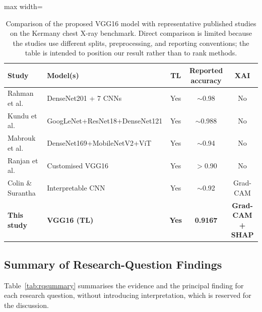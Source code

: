 \documentclass[preprint,12pt]{elsarticle}
\begin{document}
\begin{table}[!ht]
\centering
\caption{Comparison of the proposed VGG16 model with representative published studies on the Kermany chest X-ray benchmark. Direct comparison is limited because the studies use different splits, preprocessing, and reporting conventions; the table is intended to position our result rather than to rank methods.}
\label{tab:published}
\begin{adjustbox}{max width=\textwidth}
\begin{tabular}{l l c c c}
\toprule
\textbf{Study} & \textbf{Model(s)} & \textbf{TL} & \textbf{Reported accuracy} & \textbf{XAI} \\
\midrule
Rahman et al.~\cite{rahman2020transfer} & DenseNet201 + 7 CNNs & Yes & $\sim$0.98 & No \\
Kundu et al.~\cite{kundu2021pneumonia} & GoogLeNet+ResNet18+DenseNet121 & Yes & $\sim$0.988 & No \\
Mabrouk et al.~\cite{mabrouk2022pneumonia} & DenseNet169+MobileNetV2+ViT & Yes & $\sim$0.94 & No \\
Ranjan et al.~\cite{ranjan2022transfer} & Customised VGG16 & Yes & $>$0.90 & No \\
Colin \& Surantha~\cite{colin2025interpretable} & Interpretable CNN & Yes & $\sim$0.92 & Grad-CAM \\
\textbf{This study} & \textbf{VGG16 (TL)} & \textbf{Yes} & \textbf{0.9167} & \textbf{Grad-CAM + SHAP} \\
\bottomrule
\end{tabular}
\end{adjustbox}
\end{table}

\subsection{Summary of Research-Question Findings}
Table~\ref{tab:rqsummary} summarises the evidence and the principal finding for each research question, without introducing interpretation, which is reserved for the discussion.
\end{document}
